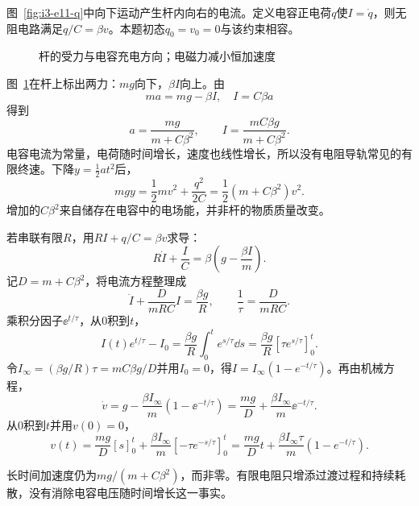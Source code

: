 \begin{solution}
图~\ref{fig:i3-e11-q}中向下运动产生杆内向右的电流。定义电容正电荷$q$使$I=\dot q$，则无阻电路满足$q/C=\beta v$。本题初态$q_0=v_0=0$与该约束相容。


\begin{figure}[H]\centering
{}
\caption{杆的受力与电容充电方向；电磁力减小恒加速度}\label{fig:i3-e11-s}
\end{figure}

图~\ref{fig:i3-e11-s}在杆上标出两力：$mg$向下，$\beta I$向上。由
\[
m a=mg-\beta I,\quad I=C\beta a
\]
得到
\[
\boxed{a=\frac{mg}{m+C\beta^2}},\qquad
I=\frac{mC\beta g}{m+C\beta^2}.
\]
电容电流为常量，电荷随时间增长，速度也线性增长，所以没有电阻导轨常见的有限终速。下降$y=\tfrac12at^2$后，
\[
mgy=\frac12mv^2+\frac{q^2}{2C}
=\frac12(m+C\beta^2)v^2.
\]
增加的$C\beta^2$来自储存在电容中的电场能，并非杆的物质质量改变。

若串联有限$R$，用$RI+q/C=\beta v$求导：
\[
R\dot I+\frac IC=\beta\left(g-\frac{\beta I}{m}\right).
\]
记$D=m+C\beta^2$，将电流方程整理成
\[
\dot I+\frac{D}{mRC}I=\frac{\beta g}{R},\qquad
\frac1\tau=\frac{D}{mRC}.
\]
乘积分因子$\ee^{t/\tau}$，从$0$积到$t$，
\[I(t)e^{t/\tau}-I_0=\frac{\beta g}{R}\int_0^te^{s/\tau}\dd s
=\frac{\beta g}{R}[\tau e^{s/\tau}]_0^t.\]
令$I_\infty=(\beta g/R)\tau=mC\beta g/D$并用$I_0=0$，得$I=I_\infty(1-e^{-t/\tau})$。再由机械方程，
\[
\dot v=g-\frac{\beta I_\infty}{m}(1-\ee^{-t/\tau})
=\frac{mg}{D}+\frac{\beta I_\infty}{m}\ee^{-t/\tau}.
\]
从$0$积到$t$并用$v(0)=0$，
\[v(t)=\frac{mg}{D}[s]_0^t+\frac{\beta I_\infty}{m}[-\tau e^{-s/\tau}]_0^t
=\frac{mg}{D}t+\frac{\beta I_\infty\tau}{m}(1-e^{-t/\tau}).\]

长时间加速度仍为$mg/(m+C\beta^2)$，而非零。有限电阻只增添过渡过程和持续耗散，没有消除电容电压随时间增长这一事实。
\end{solution}

